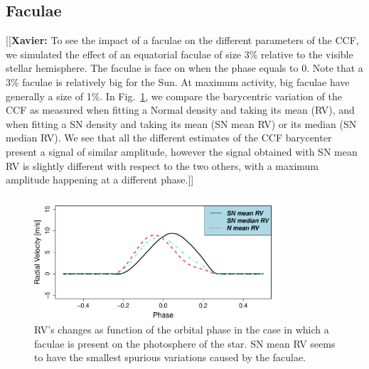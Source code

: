 \documentclass{aa}
\newcommand{\xavier}[1]{{\color{blue}[[\textbf{Xavier: }#1]]}}
\begin{document}
\subsection{Faculae} \label{sec:soap.faculae}

\xavier{To see the impact of a faculae on the different parameters of the CCF, we simulated the effect of an equatorial faculae of size 3\% relative to the visible stellar hemisphere. The faculae is face on when the phase equals to 0. Note that a 3\% faculae is relatively big for the Sun. At maximum activity, big faculae have generally a size of 1\%.
In Fig.~\ref{fig:faculae}, we compare the barycentric variation of the CCF as measured when fitting a Normal density and taking its mean (RV), and when fitting a SN density and taking its mean (SN mean RV) or its median (SN median RV). We see that all the different estimates of the CCF barycenter present a signal of similar amplitude, however the signal obtained with SN mean RV is slightly different with respect to the two others, with a maximum amplitude happening at a different phase.}

\begin{figure}[htbp]
\begin{center}
\includegraphics[width=3.6in]{RV_comparison_FACULAE.pdf} 
\caption{RV's changes as function of the orbital phase in the case in which a faculae is present on the photosphere of the star. SN mean RV seems to have the smallest spurious variations caused by the faculae.}
    \label{fig:faculae}
\end{center}
\end{figure}
\end{document}
